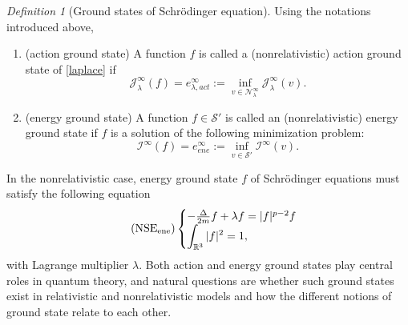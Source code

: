 \documentclass{amsart}
\theoremstyle{plain}
\theoremstyle{definition}
\theoremstyle{remark}
\newtheorem{Def}{Definition}[section]
\numberwithin{equation}{section} \numberwithin{figure}{section}
\begin{document}
\begin{Def}[Ground states of Schrödinger equation]
  Using the notations introduced above,
  \begin{enumerate}
\item (action ground state) A function $f$ is
  called a (nonrelativistic) action ground state of
\eqref{laplace} if
  \begin{equation*}
    \mathcal{J}^\infty_{\lambda}(f)=e_{\lambda,act}^\infty:=\inf_{v \in \mathcal{N}^\infty_{\lambda}}\mathcal{J}^\infty_{\lambda}(v).
  \end{equation*}
  \item (energy ground state) A function $f\in \mathcal{S}'$ is
  called an (nonrelativistic) energy ground state if 
$f$ is a solution of the following minimization problem:
\begin{equation*} 
  \mathcal{I}^\infty(f) =e_{ene}^\infty:= \inf_{v\in \mathcal{S}'}\mathcal{I}^\infty(v).
\end{equation*}
  \end{enumerate}
\end{Def}
In the nonrelativistic case, energy ground state $f$ of Schr\"odinger equations must satisfy the following equation
\begin{equation}
	\label{laplace_e}\tag{$\mathrm{NSE}_{\mathrm{ene}}$}
    \begin{cases}
      - \frac{\Delta}{2m} f +\lambda f=|f|^{p-2}f 
      \\
      \displaystyle\int_{\mathbb{R}^3}|f|^2 =1,
    \end{cases}
\end{equation}
with Lagrange multiplier $\lambda$. 
Both action and energy ground states play central roles in quantum theory, and natural questions are whether such ground states exist in relativistic and nonrelativistic models and how the different notions of ground state relate to each other.
\end{document}
